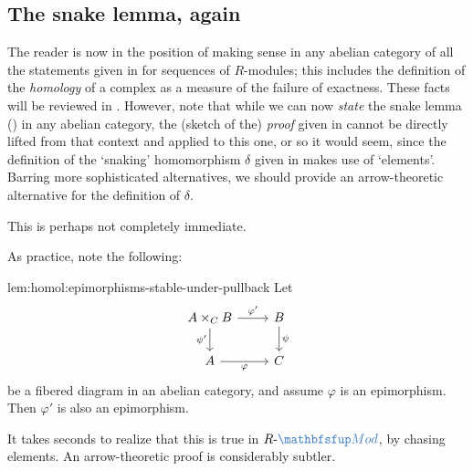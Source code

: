 \subsection{The snake lemma, again}
\label{subsec:homol:the-snake-lemma-again}
The reader is now in the position of making sense in any abelian
category of all the statements given in
 for sequences of
$R$-modules; this includes the definition of the \emph{homology} of a
complex as a measure of the failure of exactness. These facts will be
reviewed in . However,
note that while we can now \emph{state} the snake lemma
() in any abelian category, the (sketch of
the) \emph{proof} given in 
cannot be directly lifted from that context and applied to this one,
or so it would seem, since the definition of the `snaking'
homomorphism $\delta$ given in
 makes use of
`elements'. Barring more sophisticated alternatives, we should provide
an arrow-theoretic alternative for the definition of $\delta$.

This is perhaps not completely immediate.

As practice, note the following:
\begin{lem}{}{lem:homol:epimorphisms-stable-under-pullback}
  Let
  \[\begin{tikzcd}
      A \times_C B \arrow[r, "\varphi'"] \arrow[d, "\psi'"'] &
      B \arrow[d, "\psi"] \\
      A \arrow[r, "\varphi"'] & C
    \end{tikzcd}\] be a fibered diagram in an abelian category, and
  assume $\varphi$ is an epimorphism. Then $\varphi'$ is also an
  epimorphism.
\end{lem}

It takes seconds to realize that this is true in
$R\text{-}\categ{Mod}$, by chasing elements. An arrow-theoretic proof
is considerably subtler.

